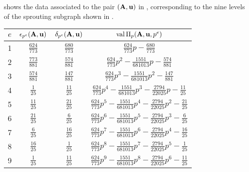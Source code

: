 \documentclass{article}
\begin{document}
\begin{example}
   \label{ex: new example.2}
    shows the data associated to the pair $(\mathbf{A},\mathbf{u})$ in , corresponding to the nine levels of the sprouting subgraph shown in .
   \begin{table}
      \begin{center}
         \begingroup
         \setlength{\tabcolsep}{8pt} %
         \renewcommand{\arraystretch}{1.4} %
         \begin{tabular}{cccc}
           \toprule
           $e$ & $\epsilon_{p^e}(\mathbf{A},\mathbf{u})$ & $\delta_{p^e}(\mathbf{A},\mathbf{u})$ & $\operatorname{val}\Pi_p(\mathbf{A},\mathbf{u},p^e)$ \\
           \midrule
           1 & $\frac{624}{773}$ & $\frac{680}{773}$ & $\frac{624}{773}p - \frac{680}{773}$\\
           2 & $\frac{773}{881}$ & $\frac{574}{881}$ & $\frac{624}{773}p^2 - \frac{\num{1551}}{\num{681013}}p - \frac{574}{881}$ \\
           3 & $\frac{574}{881}$ & $\frac{147}{881}$ & $\frac{624}{773}p^3 - \frac{\num{1551}}{\num{681013}}p^2 - \frac{147}{881}$ \\
           4 & $\frac{1}{25}$ & $\frac{11}{25}$ & $\frac{624}{773}p^4 - \frac{\num{1551}}{\num{681013}}p^3 - \frac{\num{2794}}{\num{22025}}p - \frac{11}{25}$ \\
           5 & $\frac{11}{25}$ & $\frac{21}{25}$ & $\frac{624}{773}p^5 - \frac{\num{1551}}{\num{681013}}p^4 - \frac{\num{2794}}{\num{22025}}p^2 - \frac{21}{25}$ \\
           6 & $\frac{21}{25}$ & $\frac{6}{25}$ & $\frac{624}{773}p^6 - \frac{\num{1551}}{\num{681013}}p^5 - \frac{\num{2794}}{\num{22025}}p^3 - \frac{6}{25}$ \\
           7 & $\frac{6}{25}$ & $\frac{16}{25}$ & $\frac{624}{773}p^7 - \frac{\num{1551}}{\num{681013}}p^6 - \frac{\num{2794}}{\num{22025}}p^4 - \frac{16}{25}$ \\
           8 & $\frac{16}{25}$ & $\frac{1}{25}$ & $\frac{624}{773}p^8 - \frac{\num{1551}}{\num{681013}}p^7 - \frac{\num{2794}}{\num{22025}}p^5 - \frac{1}{25}$ \\
           9 & $\frac{1}{25}$ & $\frac{11}{25}$ & $\frac{624}{773}p^9 - \frac{\num{1551}}{\num{681013}}p^8 - \frac{\num{2794}}{\num{22025}}p^6 - \frac{11}{25}$ \\
           \bottomrule

\end{tabular}
\end{center}
\end{table}
\end{example}
\end{document}

